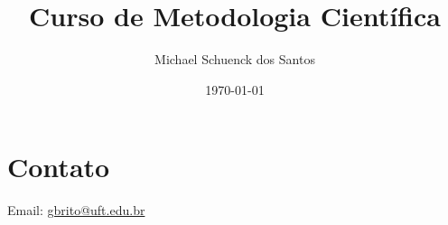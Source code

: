 \documentclass[notitlepage]{article}
\title{Curso de Metodologia Científica}
\author{Michael Schuenck dos Santos}
\date{\today}
\begin{document}
    \maketitle



    
    
    

    \section{Contato}
    Email: \href{mailto:gbrito@uft.edu.br}{gbrito@uft.edu.br}
\end{document}
